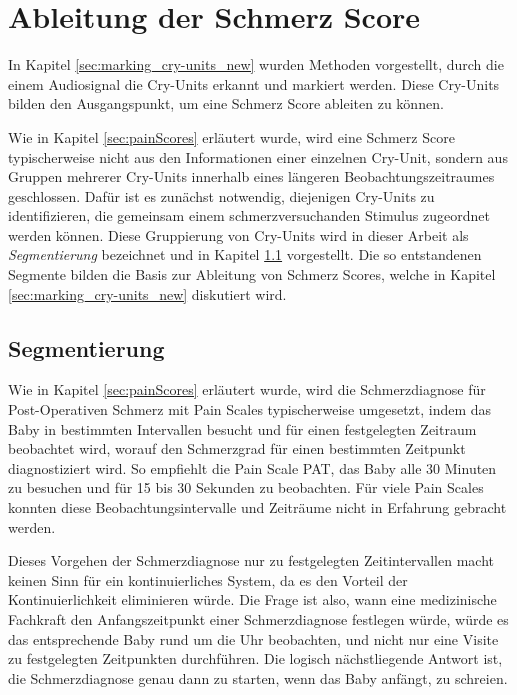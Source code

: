 \chapter{Ableitung der Schmerz Score}
\label{sec:deduction}

In Kapitel \ref{sec:marking_cry-units_new} wurden Methoden vorgestellt, durch die einem Audiosignal die Cry-Units erkannt und markiert werden. Diese Cry-Units bilden den Ausgangspunkt, um eine Schmerz Score ableiten zu können. 

Wie in Kapitel \ref{sec:painScores} erläutert wurde, wird eine Schmerz Score typischerweise nicht aus den Informationen einer einzelnen Cry-Unit, sondern aus Gruppen mehrerer Cry-Units innerhalb eines längeren Beobachtungszeitraumes geschlossen. Dafür ist es zunächst notwendig, diejenigen Cry-Units zu identifizieren, die gemeinsam einem schmerzversuchanden Stimulus zugeordnet werden können. Diese Gruppierung von Cry-Units wird in dieser Arbeit als \emph{Segmentierung} bezeichnet und in Kapitel \ref{sec:segmenting} vorgestellt. Die so entstandenen Segmente bilden die Basis zur Ableitung von Schmerz Scores, welche in Kapitel \ref{sec:marking_cry-units_new} diskutiert wird.


\section{Segmentierung}
\label{sec:segmenting}

Wie in Kapitel \ref{sec:painScores} erläutert wurde, wird die Schmerzdiagnose für Post-Operativen Schmerz mit Pain Scales typischerweise umgesetzt, indem das Baby in bestimmten Intervallen besucht und für einen festgelegten Zeitraum beobachtet wird, worauf den Schmerzgrad für einen bestimmten Zeitpunkt diagnostiziert wird. So empfiehlt die Pain Scale PAT, das Baby alle 30 Minuten zu besuchen und für 15 bis 30 Sekunden zu beobachten. Für viele Pain Scales konnten diese  Beobachtungsintervalle und Zeiträume nicht in Erfahrung gebracht werden. 

Dieses Vorgehen der Schmerzdiagnose nur zu festgelegten Zeitintervallen macht keinen Sinn für ein kontinuierliches System, da es den Vorteil der Kontinuierlichkeit eliminieren würde. Die Frage ist also, wann eine medizinische Fachkraft den Anfangszeitpunkt einer Schmerzdiagnose festlegen würde, würde es das entsprechende Baby rund um die Uhr beobachten, und nicht nur eine Visite zu festgelegten Zeitpunkten durchführen. Die logisch nächstliegende Antwort ist, die Schmerzdiagnose genau dann zu starten, wenn das Baby anfängt, zu schreien. 

